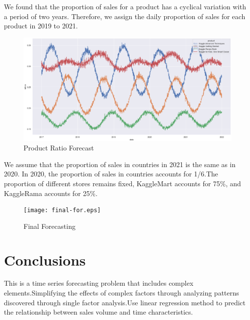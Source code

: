 We found that the proportion of sales for a product has a cyclical variation with a period of two years. Therefore, we assign the daily proportion of sales for each product in 2019 to 2021.

	\begin{figure}[htb]
	\centering
	\includegraphics[scale=0.3]{product-ratio-for.eps}
	\caption{Product Ratio Forecast}\label{fig:OutAspect-target}
\end{figure}

We assume that the proportion of sales in countries in 2021 is the same as in 2020. In 2020, the proportion of sales in countries accounts for 1/6.The proportion of different stores remains fixed, KaggleMart accounts for 75\%, and KaggleRama accounts for 25\%.

	\begin{figure}[H]
	\centering
	\texttt{[image: final-for.eps]}
	\caption{Final Forecasting}\label{fig:OutAspect-target}
\end{figure}


\section{Conclusions} \label{sec-conclusions}
This is a time series forecasting problem that includes complex elements.Simplifying the effects of complex factors through analyzing patterns discovered through single factor analysis.Use linear regression method to predict the relationship between sales volume and time characteristics.
\blindtext





